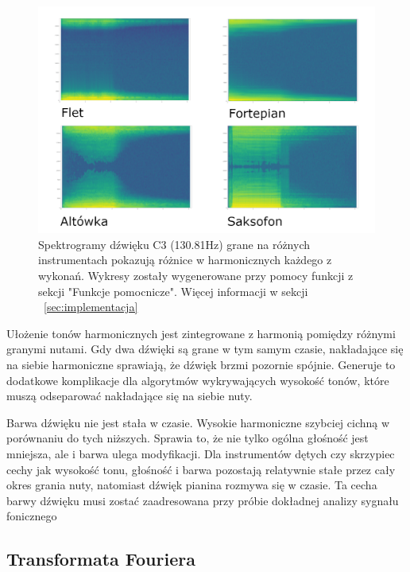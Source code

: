 \documentclass[12pt,a4paper,twoside]{mwart}
\begin{document}
\begin{figure}[H]
  \begin{center}
  \includegraphics[scale=1.4]{images/spectogram_instruments.png}\\
  Spektrogramy dźwięku C3 (130.81Hz) grane na różnych instrumentach pokazują różnice w harmonicznych każdego z wykonań. Wykresy zostały wygenerowane przy pomocy funkcji z sekcji "Funkcje pomocnicze". Więcej informacji w sekcji ~\ref{sec:implementacja}
  \end{center}
  \end{figure}

Ułożenie tonów harmonicznych jest zintegrowane z harmonią pomiędzy różnymi granymi nutami. Gdy dwa dźwięki są grane w tym samym czasie, nakładające się na siebie harmoniczne sprawiają, że dźwięk brzmi pozornie spójnie. Generuje to dodatkowe komplikacje dla algorytmów wykrywających wysokość tonów, które muszą odseparować nakładające się na siebie nuty.

Barwa dźwięku nie jest stała w czasie. Wysokie harmoniczne szybciej cichną w porównaniu do tych niższych. Sprawia to, że nie tylko ogólna głośność jest mniejsza, ale i barwa ulega modyfikacji. Dla instrumentów dętych czy skrzypiec cechy jak wysokość tonu, głośność i barwa pozostają relatywnie stałe przez cały okres grania nuty, natomiast dźwięk pianina rozmywa się w czasie. Ta cecha barwy dźwięku musi zostać zaadresowana przy próbie dokładnej analizy sygnału fonicznego

\subsection{Transformata Fouriera}
\newpage
\end{document}
